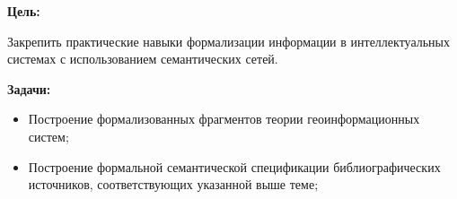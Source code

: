 
\textbf{Цель:}

Закрепить практические навыки формализации информации в интеллектуальных системах с использованием семантических сетей.
\bigskip

\textbf{Задачи:}

\begin{itemize}
    \item Построение формализованных фрагментов теории геоинформационных систем;
    \item Построение формальной семантической спецификации библиографических источников, соответствующих указанной выше теме;
\end{itemize}